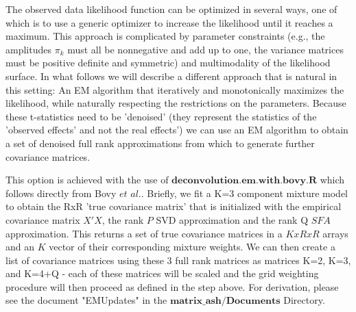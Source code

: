 \documentclass[10pt]{article}
\newcommand{\etal}{\textit{et al.}} %
\begin{document}
The observed data likelihood function can be optimized in several ways, one of which is to use a generic optimizer to increase the likelihood until it reaches a maximum. This approach is complicated by parameter constraints (e.g., the amplitudes $\pi_{k}$ must all be nonnegative and add up to one, the variance matrices must be positive definite and symmetric) and multimodality of the likelihood surface. In what follows we will describe a different approach that is natural in this setting: An EM algorithm that iteratively and monotonically maximizes the likelihood, while naturally respecting the restrictions on the parameters.
Because these t-statistics need to be 'denoised' (they represent the statistics of the 'observed effects' and not the real effects') we can use an EM algorithm to obtain a set of denoised full rank approximations from which to generate further covariance matrices. 

This option is achieved with the use of $\textbf{deconvolution.em.with.bovy.R}$ which follows directly from Bovy $\etal$. Briefly, we fit a K=3 component mixture model to obtain the RxR 'true covariance matrix' that is initialized with the empirical covariance matrix $X'X$, the rank $P$ SVD approximation and the rank Q $SFA$ approximation. This returns a set of true covariance matrices in a $KxRxR$ arrays and an $K$ vector of their corresponding mixture weights. We can then create a list of covariance matrices using these 3 full rank matrices as matrices K=2, K=3, and K=4+Q - each of these matrices will be scaled and the grid weighting procedure will then proceed as defined in the step above. For derivation, please see the document "EMUpdates" in the $\textbf{matrix_ash/Documents}$ Directory.
\end{document}
